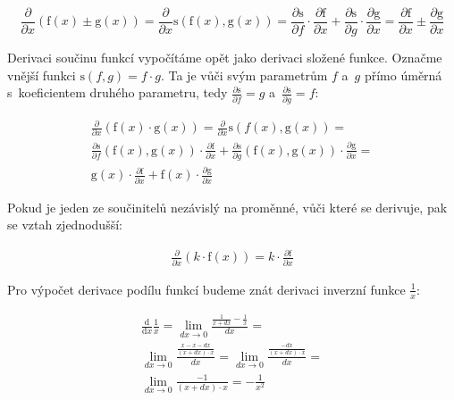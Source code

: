 \begin{equation}
\frac{\partial}{\partial x} (\mathrm{f}(x) \pm \mathrm{g}(x)) = \frac{\partial}{\partial x} \mathrm{s}(\mathrm{f}(x), \mathrm{g}(x)) = \frac{\partial \mathrm{s}}{\partial f} \cdot \frac{\partial \mathrm{f}}{\partial x} + \frac{\partial \mathrm{s}}{\partial g} \cdot \frac{\partial \mathrm{g}}{\partial x} = \frac{\partial \mathrm{f}}{\partial x} \pm \frac{\partial \mathrm{g}}{\partial x}
\end{equation}

Derivaci součinu funkcí vypočítáme opět jako derivaci složené funkce. Označme vnější funkci \(\mathrm{s}(f, g) = f \cdot g\). Ta je vůči svým parametrům \(f\) a~\(g\) přímo úměrná s~koeficientem druhého parametru, tedy \(\frac{\partial \mathrm{s}}{\partial f} = g\) a~\(\frac{\partial \mathrm{s}}{\partial g} = f\):

\begin{equation}
\begin{split}
\frac{\partial}{\partial x} (\mathrm{f}(x) \cdot \mathrm{g}(x)) = \frac{\partial}{\partial x} \mathrm{s}({f}(x), \mathrm{g}(x)) = \\
\frac{\partial \mathrm{s}}{\partial f} (\mathrm{f}(x), \mathrm{g}(x)) \cdot \frac{\partial \mathrm{f}}{\partial x} + \frac{\partial \mathrm{s}}{\partial g}(\mathrm{f}(x), \mathrm{g}(x)) \cdot \frac{\partial \mathrm{g}}{\partial x} = \\
\mathrm{g}(x) \cdot \frac{\partial \mathrm{f}}{\partial x} + \mathrm{f}(x) \cdot \frac{\partial \mathrm{g}}{\partial x}
\end{split}
\end{equation}

Pokud je jeden ze součinitelů nezávislý na proměnné, vůči které se derivuje, pak se vztah zjednodušší:

\begin{equation}
\begin{split}
\frac{\partial}{\partial x} (k \cdot \mathrm{f}(x)) = k \cdot \frac{\partial \mathrm{f}}{\partial x}
\end{split}
\end{equation}

Pro výpočet derivace podílu funkcí budeme znát derivaci inverzní funkce \(\frac{1}{x}\):

\begin{equation}
\begin{split}
\frac{\mathrm{d}}{\mathrm{d}x} \frac{1}{x} = \lim_{dx \to 0} \frac{\frac{1}{x + dx} - \frac{1}{x}}{dx} = \\
\lim_{dx \to 0} \frac{\frac{x - x - dx}{(x + dx) \cdot x}}{dx} = \lim_{dx \to 0} \frac{\frac{-dx}{(x + dx) \cdot x}}{dx} = \\
\lim_{dx \to 0} \frac{-1}{(x + dx) \cdot x} = -\frac{1}{x^2}
\end{split}
\end{equation}

